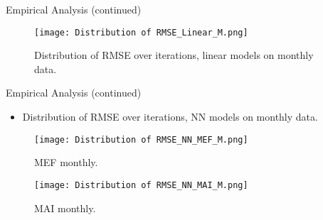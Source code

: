 \documentclass{beamer}
\begin{document}
\begin{frame}{Empirical Analysis (continued)}
  \begin{figure}
    \centering
    \texttt{[image: Distribution of RMSE\_Linear\_M.png]}
    \caption{Distribution of RMSE over iterations, linear models on monthly data.}
    \label{fig:linear_prediction_ii}
  \end{figure}
\end{frame}

\begin{frame}{Empirical Analysis (continued)}
  \begin{itemize}
    \item Distribution of RMSE over iterations, NN models on monthly data.
  \end{itemize}

  \begin{figure}[H]
    \centering
    \begin{minipage}{0.48\textwidth}
      \centering
      \texttt{[image: Distribution of RMSE\_NN\_MEF\_M.png]}
      \caption{MEF monthly.}
      \label{fig:linear_prediction}
    \end{minipage}\hfill
    \begin{minipage}{0.48\textwidth}
      \centering
      \texttt{[image: Distribution of RMSE\_NN\_MAI\_M.png]}
      \caption{MAI monthly.}
      \label{fig:nn_prediction}
    \end{minipage}
  \end{figure}
\end{frame}
\end{document}
